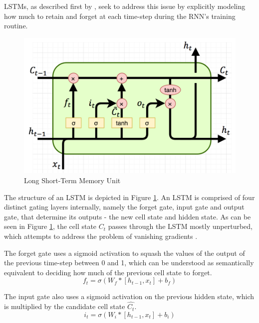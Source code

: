 LSTMs, as described first by \cite{hochreiter1997long}, seek to address this issue by explicitly modeling how much to retain and forget at each time-step during the RNN's training routine.

\begin{figure}[ht]
	\centering
	\includegraphics[width=\textwidth]{images/lstm}
	\caption{\label{fig:lstm} Long Short-Term Memory Unit}
\end{figure}

The structure of an LSTM is depicted in Figure \ref{fig:lstm}. An LSTM is comprised of four distinct gating layers internally, namely the forget gate, input gate and output gate, that determine its outputs - the new cell state and hidden state. As can be seen in Figure \ref{fig:lstm}, the cell state $C_t$ passes through the LSTM mostly unperturbed, which attempts to address the problem of vanishing gradients \citep{hochreiter1999vanishing}.

The forget gate uses a sigmoid activation to squash the values of the output of the previous time-step between 0 and 1, which can be understood as semantically equivalent to deciding how much of the previous cell state to forget. 
\begin{equation*}
    f_t = \sigma(W_f*[h_{t-1}, x_t] + b_f)
\end{equation*}

The input gate also uses a sigmoid activation on the previous hidden state, which is multiplied by the candidate cell state $\hat{C_t}$. 
\begin{equation*}
    i_t = \sigma(W_i*[h_{t-1}, x_t] + b_i)
\end{equation*}

